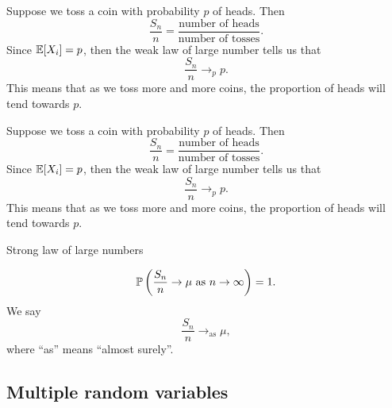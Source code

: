 \begin{note}
  \begin{field}
    \begin{eg}
      Suppose we toss a coin with probability $p$ of heads. Then
      \[
        \frac{S_n}{n} = \frac{\text{number of heads}}{\text{number of tosses}}.
      \]
      Since $\E[X_i] = p$, then the weak law of large number tells us that
      \[
        \frac{S_n}{n} \to_p p.
      \]
      This means that as we toss more and more coins, the proportion of heads will tend towards $p$.
    \end{eg}
  \end{field}
  \begin{field}
    \begin{eg}
      Suppose we toss a coin with probability $p$ of heads. Then
      \[
        \frac{S_n}{n} = \frac{\text{number of heads}}{\text{number of tosses}}.
      \]
      Since $\E[X_i] = p$, then the weak law of large number tells us that
      \[
        \frac{S_n}{n} \to_p p.
      \]
      This means that as we toss more and more coins, the proportion of heads will tend towards $p$.
    \end{eg}
  \end{field}
  \xplain{}%
\end{note}

%
\begin{note}
  \begin{field}
    Strong law of large numbers
  \end{field}
  \begin{field}
    \begin{thm}
      \[
        \P\left(\frac{S_n}{n}\to \mu\text{ as }n\to \infty\right) = 1.
      \]
      We say
      \[
        \frac{S_n}{n}\to_{\mathrm{as}} \mu,
      \]
      where ``as'' means ``almost surely''.
    \end{thm}
  \end{field}
  \xplain{}%
\end{note}

\subsection{Multiple random variables}

